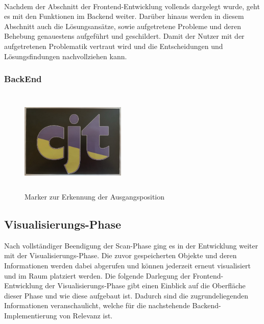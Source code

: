 \pagebreak
\\ 
Nachdem der Abschnitt der Frontend-Entwicklung vollends dargelegt wurde, geht es mit den Funktionen im Backend weiter. Darüber hinaus werden in diesem 
Abschnitt auch die Lösungsansätze, sowie aufgetretene Probleme und deren Behebung genauestens aufgeführt und geschildert. Damit der Nutzer mit der 
aufgetretenen Problematik vertraut wird und die Entscheidungen und Lösungsfindungen nachvollziehen kann. 
\subsubsection{BackEnd}
\begin{figure}[hbt!]
    \centering
    \includegraphics[width=5cm,height=5cm,keepaspectratio]{4Umsetzung/Bilder/cjt_logo_tracking.png}
    \caption{Marker zur Erkennung der Ausgangsposition}
    \label{pic:initialMarker}
\end{figure}

\subsection{Visualisierungs-Phase} 
Nach vollständiger Beendigung der Scan-Phase ging es in der Entwicklung weiter mit der Visualisierungs-Phase. Die zuvor gespeicherten Objekte und 
deren Informationen werden dabei abgerufen und können jederzeit erneut visualisiert und im Raum platziert werden. Die folgende Darlegung der 
Frontend-Entwicklung der Visualisierungs-Phase gibt einen Einblick auf die Oberfläche dieser Phase und wie diese aufgebaut ist. Dadurch sind die 
zugrundeliegenden Informationen veranschaulicht, welche für die nachstehende Backend-Implementierung von Relevanz ist.   

